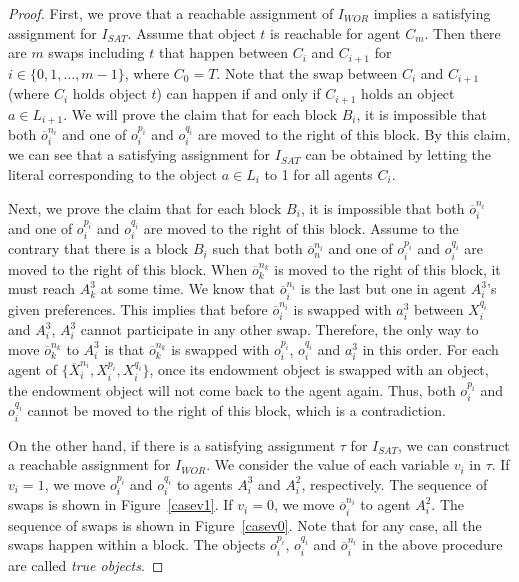 \begin{proof}
First, we prove that a reachable assignment of $I_{WOR}$  implies a satisfying assignment for $I_{SAT}$.
     Assume that object $t$ is reachable for agent $C_m$. Then there are $m$ swaps including $t$ that happen between $C_i$ and $C_{i+1}$ for $i\in\{0,1,\dots, m-1\}$, where $C_0=T$. Note that the swap between $C_i$ and $C_{i+1}$ (where $C_i$ holds object $t$) can happen if and only if $C_{i+1}$ holds an object $a\in L_{i+1}$.
    We will prove the claim that for each block $B_i$, it is impossible that both $\overline{o}_i^{n_i}$ and one of ${o}_i^{p_i}$ and ${o}_i^{q_i}$ are moved to the right of this block.
    By this claim, we can see that a satisfying assignment for $I_{SAT}$ can be obtained by letting the literal corresponding to the object $a\in L_i$ to 1 for all agents $C_i$.


Next, we prove the claim that for each block $B_i$, it is impossible that both $\overline{o}_i^{n_i}$ and one of ${o}_i^{p_i}$ and ${o}_i^{q_i}$ are moved to the right of this block.
    Assume to the contrary that there is a block $B_i$ such that both $\overline{o}_n^{n_i}$ and one of ${o}_i^{p_i}$ and ${o}_i^{q_i}$ are moved to the right of this block.
    When $\overline{o}_k^{n_k}$ is moved to the right of this block, it must reach $A_k^3$ at some time.
    We know that $\overline{o}_i^{n_i}$ is the last but one in agent $A_i^3$'s given preferences. This implies that before $\overline{o}_i^{n_i}$ is swapped with $a_i^3$ between $X_i^{q_i}$ and $A_i^3$, $A_i^3$ cannot participate in any other swap.
    Therefore, the only way to move $\overline{o}_k^{n_k}$ to $A_i^3$ is that $\overline{o}_k^{n_k}$ is swapped with ${o}_i^{p_i}$, ${o}_i^{q_i}$ and $a_i^3$ in this order.
    For each agent of $\{\overline{X}_i^{n_i},X_i^{p_i},X_i^{q_i}\}$, once its endowment object is swapped with an object, the endowment object
    will not come back to the agent again.
    Thus, both $o_i^{p_i}$ and $o_i^{q_i}$ cannot be moved to the right of this block, which is a contradiction.




    On the other hand, if there is a satisfying assignment $\tau$ for $I_{SAT}$, we can construct a reachable assignment for $I_{WOR}$.
    We consider the value of each variable $v_i$ in $\tau$. If $v_i=1$, we move ${o}_i^{p_i}$ and ${o}_i^{q_i}$ to agents $A_i^3$ and $A_i^2$, respectively.
    The sequence of swaps is shown in Figure~\ref{casev1}. If $v_i=0$, we move $\overline{o}_i^{n_i}$ to agent $A_i^2$.
    The sequence of swaps is shown in Figure~\ref{casev0}. Note that for any case, all the swaps happen within a block.
    The objects ${o}_i^{p_i}$, ${o}_i^{q_i}$ and $\overline{o}_i^{n_i}$ in the above procedure are called \emph{true objects}.


\end{proof}
